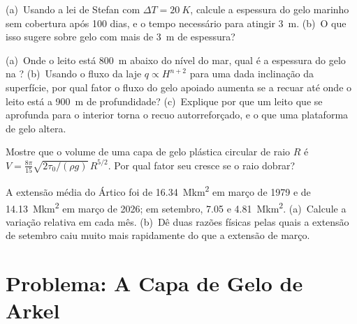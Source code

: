 \begin{exercise}[$\star\star$]\label{exo:b3:glaciology:9}
(a)~Usando a lei de Stefan com $\Delta T = \qty{20}{K}$, calcule a espessura
do gelo marinho sem cobertura após 100 dias, e o tempo necessário para atingir \qty{3}{m}.
(b)~O que isso sugere sobre gelo com mais de \qty{3}{m} de espessura?
\end{exercise}

\begin{exercise}[$\star\star\star$]\label{exo:b3:glaciology:10}
(a)~Onde o leito está \qty{800}{m} abaixo do nível do mar, qual é a espessura do gelo na
? (b)~Usando o fluxo da laje $q \propto H^{n+2}$ para uma dada
inclinação da superfície, por qual fator o fluxo do gelo apoiado aumenta se a
 recuar até onde o leito está a \qty{900}{m} de profundidade? (c)~Explique
por que um leito que se aprofunda para o interior torna o recuo autorreforçado, e o que
uma plataforma de gelo altera.
\end{exercise}

\begin{exercise}[$\star\star\star$]\label{exo:b3:glaciology:11}
Mostre que o volume de uma capa de gelo plástica circular de raio $R$ é $V =
\frac{8\pi}{15}\sqrt{2\tau_0/(\rho g)}\,R^{5/2}$. Por qual fator seu 
cresce se o raio dobrar?
\end{exercise}

\begin{exercise}[$\star\star\star$]\label{exo:b3:glaciology:12}
A extensão média do Ártico foi de \qty{16.34}{\mega km^2} em março de 1979 e de
\qty{14.13}{\mega km^2} em março de 2026; em setembro, \num{7.05} e
\qty{4.81}{\mega km^2}. (a)~Calcule a variação relativa em cada mês.
(b)~Dê duas razões físicas pelas quais a extensão de setembro caiu muito
mais rapidamente do que a extensão de março.
\end{exercise}

\section{Problema: A Capa de Gelo de Arkel}

